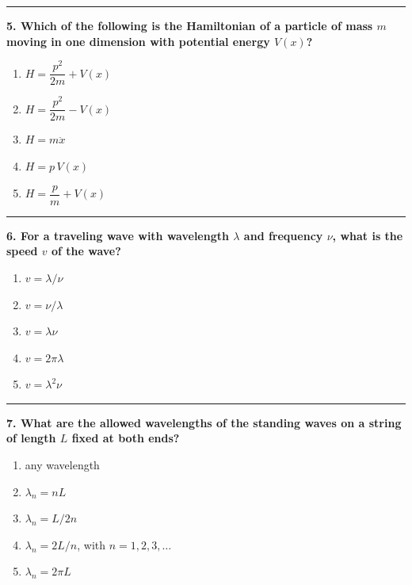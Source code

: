 \documentclass[
  english,
  9pt,
]{extbook}
\providecommand{\tightlist}{%
  \setlength{\itemsep}{0pt}\setlength{\parskip}{0pt}}
\theoremstyle{definition}
\theoremstyle{definition}
\theoremstyle{definition}
\theoremstyle{definition}
\theoremstyle{remark}
\begin{document}
\begin{center}\rule{0.5\linewidth}{0.5pt}\end{center}

\textbf{5. Which of the following is the Hamiltonian of a particle of mass \(m\) moving in one dimension with potential energy \(V(x)\)?}

\begin{enumerate}
\def\labelenumi{\alph{enumi}.}
\tightlist
\item
  \(H = \dfrac{p^2}{2m} + V(x)\)\\
\item
  \(H = \dfrac{p^2}{2m} - V(x)\)\\
\item
  \(H = m\ddot{x}\)\\
\item
  \(H = p\,V(x)\)\\
\item
  \(H = \dfrac{p}{m} + V(x)\)
\end{enumerate}

\begin{center}\rule{0.5\linewidth}{0.5pt}\end{center}

\textbf{6. For a traveling wave with wavelength \(\lambda\) and frequency \(\nu\), what is the speed \(v\) of the wave?}

\begin{enumerate}
\def\labelenumi{\alph{enumi}.}
\tightlist
\item
  \(v = \lambda/\nu\)\\
\item
  \(v = \nu/\lambda\)\\
\item
  \(v = \lambda\nu\)\\
\item
  \(v = 2\pi\lambda\)\\
\item
  \(v = \lambda^2\nu\)
\end{enumerate}

\begin{center}\rule{0.5\linewidth}{0.5pt}\end{center}

\textbf{7. What are the allowed wavelengths of the standing waves on a string of length \(L\) fixed at both ends?}

\begin{enumerate}
\def\labelenumi{\alph{enumi}.}
\tightlist
\item
  any wavelength\\
\item
  \(\lambda_n = nL\)\\
\item
  \(\lambda_n = L/2n\)\\
\item
  \(\lambda_n = 2L/n\), with \(n=1,2,3,\ldots\)\\
\item
  \(\lambda_n = 2\pi L\)
\end{enumerate}
\end{document}
